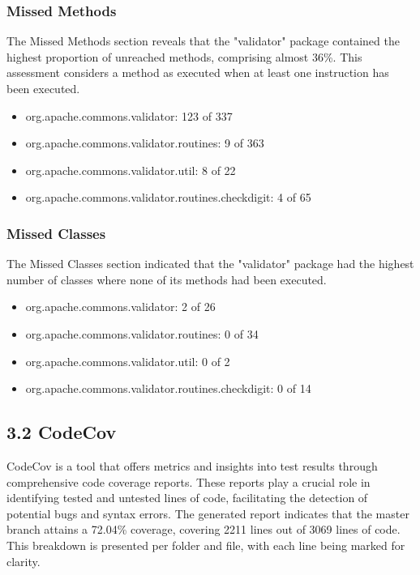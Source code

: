 \documentclass{sigchi}
\begin{document}
\subsubsection{\textbf{Missed Methods}}
The Missed Methods section reveals that the "validator" package contained the highest proportion of unreached methods, comprising almost 36\%. This assessment considers a method as executed when at least one instruction has been executed.
\begin{itemize}
    \item org.apache.commons.validator: 123 of 337
    \item org.apache.commons.validator.routines: 9 of 363
    \item org.apache.commons.validator.util: 8 of 22
    \item org.apache.commons.validator.routines.checkdigit: 4 of 65
\end{itemize}

\subsubsection{\textbf{Missed Classes}}
The Missed Classes section indicated that the "validator" package had the highest number of classes where none of its methods had been executed.
\begin{itemize}
    \item org.apache.commons.validator: 2 of 26
    \item org.apache.commons.validator.routines: 0 of 34
    \item org.apache.commons.validator.util: 0 of 2
    \item org.apache.commons.validator.routines.checkdigit: 0 of 14
\end{itemize}


\subsection{3.2 CodeCov}
CodeCov \cite{codecov} is a tool that offers metrics and insights into test results through comprehensive code coverage reports. These reports play a crucial role in identifying tested and untested lines of code, facilitating the detection of potential bugs and syntax errors. 
The generated report indicates that the master branch attains a 72.04\% coverage, covering 2211 lines out of 3069 lines of code. This breakdown is presented per folder and file, with each line being marked for clarity.
\end{document}
